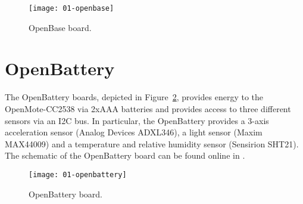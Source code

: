 \begin{figure}[!ht]
    \centering
	\texttt{[image: 01-openbase]}
    \caption{OpenBase board.}
    \label{fig:openbase}
\end{figure}

\section{OpenBattery}
The OpenBattery boards, depicted in Figure~\ref{fig:openbattery}, provides energy to the OpenMote-CC2538 via 2xAAA batteries and provides access to three different sensors via an I2C bus. In particular, the OpenBattery provides a 3-axis acceleration sensor (Analog Devices ADXL346), a light sensor (Maxim MAX44009) and a temperature and relative humidity sensor (Sensirion SHT21). The schematic of the OpenBattery board can be found online in \cite{openbattery_schematic}.

\begin{figure}[!ht]
    \centering
	\texttt{[image: 01-openbattery]}
    \caption{OpenBattery board.}
    \label{fig:openbattery}
\end{figure}